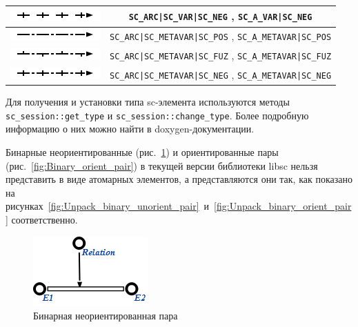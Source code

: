 \begin{table}[ht]
\begin{tabular}{|c|c|}
    \hline
	\includegraphics{images/4/scg2sc/pair_var_perm_neg} & \verb+SC_ARC|SC_VAR|SC_NEG+
    , \verb+SC_A_VAR|SC_NEG+ \\
    
    \hline
	\includegraphics{images/4/scg2sc/pair_meta_perm_pos} & \verb+SC_ARC|SC_METAVAR|SC_POS+
    , \verb+SC_A_METAVAR|SC_POS+ \\
    
    \hline
	\includegraphics{images/4/scg2sc/pair_meta_perm_fuz} & \verb+SC_ARC|SC_METAVAR|SC_FUZ+
    , \verb+SC_A_METAVAR|SC_FUZ+ \\
    
    \hline
	\includegraphics{images/4/scg2sc/pair_meta_perm_neg} & \verb+SC_ARC|SC_METAVAR|SC_NEG+
    , \verb+SC_A_METAVAR|SC_NEG+ \\
    
    \hline
  \end{tabular}
  \label{tab:SCgType2SCType}
\end{table}

Для получения и установки типа sc-элемента используются методы
\lstinline{sc_session::get_type} и
\lstinline{sc_session::change_type}. Более подробную информацию о них
можно найти в doxygen-документации.

Бинарные неориентированные (рис.~\ref{fig:Binary_unorient_pair}) и
ориентированные пары (рис.~\ref{fig:Binary_orient_pair}) в текущей
версии библиотеки libsc нельзя представить в виде атомарных элементов,
а представляются они так, как показано на
рисунках~\ref{fig:Unpack_binary_unorient_pair}~и~\ref{fig:Unpack_binary_orient_pair}
соответственно.

\begin{figure}[h!]
  \centering
  \includegraphics{images/4/scg2sc/Binary_unorient_pair}
  \caption{Бинарная неориентированная пара}
  \label{fig:Binary_unorient_pair}
\end{figure}

